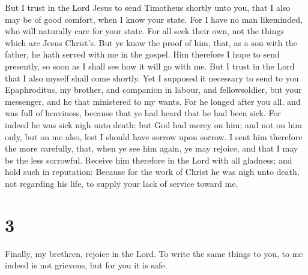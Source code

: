  But I trust in the Lord Jesus to send Timotheus shortly
unto you, that I also may be of good comfort, when I know your state.
 For I have no man likeminded, who will naturally care for
your state.  For all seek their own, not the things which
are Jesus Christ's.  But ye know the proof of him, that, as
a son with the father, he hath served with me in the gospel.
 Him therefore I hope to send presently, so soon as I shall
see how it will go with me.  But I trust in the Lord that I
also myself shall come shortly.  Yet I supposed it
necessary to send to you Epaphroditus, my brother, and companion in
labour, and fellowsoldier, but your messenger, and he that ministered to
my wants.  For he longed after you all, and was full of
heaviness, because that ye had heard that he had been sick.
 For indeed he was sick nigh unto death: but God had mercy
on him; and not on him only, but on me also, lest I should have sorrow
upon sorrow.  I sent him therefore the more carefully,
that, when ye see him again, ye may rejoice, and that I may be the less
sorrowful.  Receive him therefore in the Lord with all
gladness; and hold such in reputation:  Because for the
work of Christ he was nigh unto death, not regarding his life, to supply
your lack of service toward me.

\hypertarget{section-2}{%
\section{3}\label{section-2}}

 Finally, my brethren, rejoice in the Lord. To write the
same things to you, to me indeed is not grievous, but for you it is
safe.

